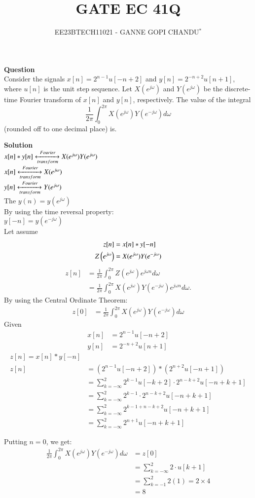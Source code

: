 \documentclass[journal,12pt,twocolumn]{IEEEtran}
\theoremstyle{remark}
\begin{document}

\vspace{3cm}
\title{GATE EC 41Q}
\author{EE23BTECH11021 - GANNE GOPI CHANDU$^{*}$%
}
\maketitle
\bigskip
\renewcommand{\thefigure}{\theenumi}
\renewcommand{\thetable}{\theenumi}

\textbf{Question}\\
Consider the signals \(x[n] = 2^{n-1} u[-n+2]\) and \(y[n] = 2^{-n+2} u[n+1]\), where \(u[n]\) is the unit step sequence. Let \(X(e^{j\omega})\) and \(Y(e^{j\omega})\) be the discrete-time Fourier transform of \(x[n]\) and \(y[n]\), respectively. The value of the integral
\[
\frac{1}{2\pi} \int_{0}^{2\pi} X(e^{j\omega}) Y(e^{-j\omega}) d\omega
\]
(rounded off to one decimal place) is.

\textbf{Solution}\\
 $x[n]*y[n] \xleftrightarrow[transform]{Fourier} X(e^{j\omega}) Y(e^{j\omega})$\\
 $x[n] \xleftrightarrow[transform]{Fourier} X(e^{j\omega}) $\\
 $y[n] \xleftrightarrow[transform]{Fourier} Y(e^{j\omega}) $\\
 The $y(n) = y(e^{j\omega})$\\
By using the time reversal property:\\
$y[-n] = y(e^{-j\omega})$\\
Let assume
\begin{align}
     z[n]& = x[n] * y[-n]\\
     Z\left(e^{j \omega}\right) &=X(e^{j\omega}) Y(e^{-j\omega})
 \end{align}
\begin{align}
      z[n]& =\frac{1}{2\pi} \int_{0}^{2\pi} Z(e^{j\omega})e^{j \omega n} d\omega \\
      &=\frac{1}{2\pi} \int_{0}^{2\pi}  X(e^{j\omega}) Y(e^{-j\omega})e^{j \omega n} d\omega.
 \end{align}
By using the Central Ordinate Theorem: 
\begin{align}
    z[0]&=\frac{1}{2\pi} \int_{0}^{2\pi} X(e^{j\omega}) Y(e^{-j\omega}) d\omega
\end{align}
Given
\begin{align}
     x[n]& = 2^{n-1} u[-n+2]\\
     y[n]&=2^{-n+2}u[n+1]
\end{align}
\begin{align}
    z[n] = x[n] * y[-n]\\
    z[n] &= (2^{n-1} u[-n+2]) * (2^{n+2}u[-n+1])\\
 &= \sum_{k=-\infty}^{2} 2^{k-1} u[-k+2]\cdot 2^{n-k+2} u[-n+k+1]\\
 &= \sum_{k=-\infty}^{2} 2^{k-1} \cdot 2^{n-k+2} u[-n+k+1]\\
 &= \sum_{k=-\infty}^{2} 2^{k-1+n-k+2} u[-n+k+1]\\
 &= \sum_{k=-\infty}^{2} 2^{n+1} u[-n+k+1]
\end{align}

Putting $n = 0$, we get:
\begin{align}
     \frac{1}{2\pi} \int_{0}^{2\pi} X(e^{j\omega}) Y(e^{-j\omega}) d\omega &= z[0]\\
     &= \sum_{k=-\infty}^{2} 2 \cdot u[k+1] \\
     &=\sum_{k=-1}^{2} 2(1) = 2 \times 4 \\
     &= 8
\end{align}
\end{document}
